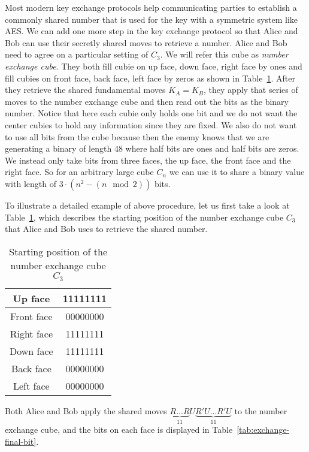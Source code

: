 \par Most modern key exchange protocols help communicating parties to establish a commonly shared number that is used for the key with a symmetric system like AES. We can add one more step in the key exchange protocol so that Alice and Bob can use their secretly shared moves to retrieve a number. Alice and Bob need to agree on a particular setting of $C_3$. We will refer this cube as \textit{number exchange cube}. They both fill cubie on up face, down face, right face by ones and fill cubies on front face, back face, left face by zeros as shown in Table~\ref{tab:exchange-start-bit}. After they retrieve the shared fundamental moves $K_A = K_B$, they apply that series of moves to the number exchange cube and then read out the bits as the binary number. Notice that here each cubie only holds one bit and we do not want the center cubies to hold any information since they are fixed. We also do not want to use all bits from the cube because then the enemy knows that we are generating a binary of length 48 where half bits are ones and half bits are zeros. We instead only take bits from three faces, the up face, the front face and the right face. So for an arbitrary large cube $C_n$ we can use it to share a binary value with length of $3 \cdot (n^2 - (n \mod 2))$ bits.
\par To illustrate a detailed example of above procedure, let us first take a look at Table~\ref{tab:exchange-start-bit}, which describes the starting position of the number exchange cube $C_3$ that Alice and Bob uses to retrieve the shared number. 
\begin{table}[ht]
    \centering
    \begin{tabular}{|c|c|}
        \hline Up face & 11111111  \\
        \hline Front face & 00000000  \\
        \hline Right face & 11111111  \\
        \hline Down face & 11111111  \\
        \hline Back face & 00000000  \\
        \hline Left face & 00000000  \\ \hline
    \end{tabular}
    \caption{Starting position of the number exchange cube $C_3$}
    \label{tab:exchange-start-bit}
\end{table}
Both Alice and Bob apply the shared moves $\underbrace{R...R}_{11}U\underbrace{R'U...R'U}_{11}$ to the number exchange cube, and the bits on each face is displayed in Table~\ref{tab:exchange-final-bit}.
